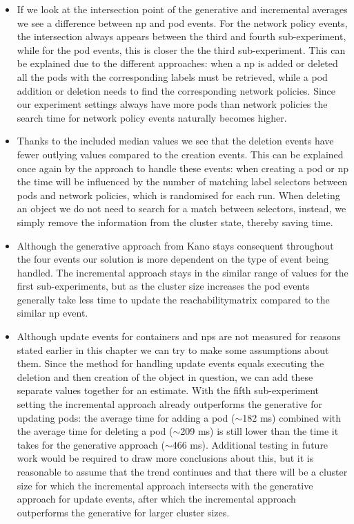 \begin{itemize}
    \item If we look at the intersection point of the generative and incremental averages we see a difference between \acrshort{np} and pod events. For the network policy events, the intersection always appears between the third and fourth sub-experiment, while for the pod events, this is closer the the third sub-experiment. This can be explained due to the different approaches: when a \acrshort{np} is added or deleted all the pods with the corresponding labels must be retrieved, while a pod addition or deletion needs to find the corresponding network policies. Since our experiment settings always have more pods than network policies the search time for network policy events naturally becomes higher.
    
    \item Thanks to the included median values we see that the deletion events have fewer outlying values compared to the creation events. This can be explained once again by the approach to handle these events: when creating a pod or \acrshort{np} the time will be influenced by the number of matching label selectors between pods and network policies, which is randomised for each run. When deleting an object we do not need to search for a match between selectors, instead, we simply remove the information from the cluster state, thereby saving time.
    
    \item Although the generative approach from Kano stays consequent throughout the four events our solution is more dependent on the type of event being handled. The incremental approach stays in the similar range of values for the first sub-experiments, but as the cluster size increases the pod events generally take less time to update the reachabilitymatrix compared to the similar \acrshort{np} event. 
    
    \item Although update events for containers and \acrshort{np}s are not measured for reasons stated earlier in this chapter we can try to make some assumptions about them. Since the method for handling update events equals executing the deletion and then creation of the object in question, we can add these separate values together for an estimate. With the fifth sub-experiment setting the incremental approach already outperforms the generative for updating pods: the average time for adding a pod ($\sim$182 ms) combined with the average time for deleting a pod ($\sim$209 ms) is still lower than the time it takes for the generative approach ($\sim$466 ms). Additional testing in future work would be required to draw more conclusions about this, but it is reasonable to assume that the trend continues and that there will be a cluster size for which the incremental approach intersects with the generative approach for update events, after which the incremental approach outperforms the generative for larger cluster sizes.
\end{itemize}

